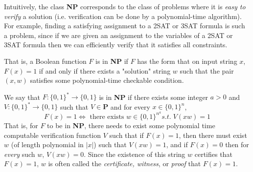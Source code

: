   Intuitively, the class \textbf{NP} corresponds to the class of problems where it is \textit{easy to verify} a solution (i.e. verification can be done by a polynomial-time algorithm). For example, finding a satisfying assignment to a 2SAT or 3SAT formula is such a problem, since if we are given an assignment to the variables of a 2SAT or 3SAT formula then we can efficiently verify that it satisfies all constraints. 

  That is, a Boolean function $F$ is in \textbf{NP} if $F$ has the form that on input string $x$, $F(x) = 1$ if and only if there exists a "solution" string $w$ such that the pair $(x, w)$ satisfies some polynomial-time checkable condition. 

  \begin{definition}
    \label{def:np-nondeterministic-polynomial-time}
  We say that $F: \{0,1\}^* \to \{0,1\}$ is in \textbf{NP} if there exists some integer $a > 0$ and $V: \{0,1\}^* \to \{0,1\}$ such that $V \in \mathbf{P}$ and for every $x \in \{0,1\}^n$, 
  \begin{equation}
    F(x) = 1 \iff \text{ there exists } w \in \{0,1\}^{n^a} s.t. \; V(x w) = 1
  \end{equation}
  That is, for $F$ to be in \textbf{NP}, there needs to exist some polynomial time computable verification function $V$ such that if $F(x) = 1$, then there must exist $w$ (of length polynomial in $|x|$) such that $V(x w) = 1$, and if $F(x) = 0$ then for \textit{every} such $w$, $V(xw) = 0$. Since the existence of this string $w$ certifies that $F(x) = 1$, $w$ is often called the \textit{certificate, witness}, or \textit{proof} that $F(x) = 1$. 
  \end{definition}

